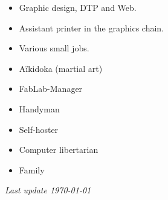 \documentclass[10pt,a4paper,ragged2e,withhyper,normalphoto]{altacv}
\begin{document}
\begin{paracol}{2}
\divider

\begin{itemize}
\item Graphic design, DTP and Web.
\end{itemize}

\divider

\begin{itemize}
\item Assistant printer in the graphics chain.
\end{itemize}

\divider

\begin{itemize}
\item Various small jobs.
\end{itemize}

\end{paracol}


\begin{paracol}{2}

\begin{itemize}
\item Aïkidoka (martial art)
\item FabLab-Manager
\item Handyman
\switchcolumn
\item Self-hoster
\item Computer libertarian
\item Family
\end{itemize}

\end{paracol}

\bigskip

\raggedleft
{\textit{Last update \today}}
\end{document}
